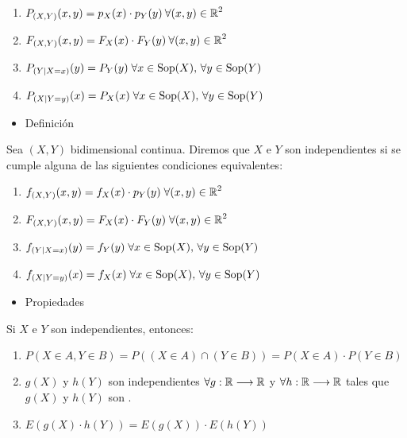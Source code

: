 \begin{enumerate}[label=\color{red}\textbf{\Alph*)},leftmargin=*]
\begin{enumerate}[label=\color{lightblue}\arabic*)]
	\item $P_{(X,Y)}(x,y)=p_X(x)\cdot p_Y(y)\:\forall(x,y)\in\operatorname{\mathbb{R}}^2$
	\item $F_{(X,Y)}(x,y)=F_X(x)\cdot F_Y(y)\:\forall(x,y)\in\operatorname{\mathbb{R}}^2$
	\item $P_{(Y|X=x)}(y)=P_Y(y)\;\forall x\in\operatorname{Sop}(X),\,\forall y\in\operatorname{Sop}(Y)$
	\item $P_{(X|Y=y)}(x)=P_X(x)\;\forall x\in\operatorname{Sop}(X),\,\forall y\in\operatorname{Sop}(Y)$
\end{enumerate}
\begin{itemize}[label=\color{red}\textbullet, leftmargin=*]
	\item \color{lightblue}Definición
\end{itemize}
Sea $(X,Y)$ \va bidimensional continua. Diremos que $X$ e $Y$ son independientes si se cumple alguna de las siguientes condiciones equivalentes:
\begin{enumerate}[label=\color{lightblue}\arabic*)]
	\item $f_{(X,Y)}(x,y)=f_X(x)\cdot p_Y(y)\;\forall(x,y)\in\operatorname{\mathbb{R}}^2$
	\item $F_{(X,Y)}(x,y)=F_X(x)\cdot F_Y(y)\;\forall(x,y)\in\operatorname{\mathbb{R}}^2$
	\item $f_{(Y|X=x)}(y)=f_Y(y)\;\forall x\in\operatorname{Sop}(X),\,\forall y\in\operatorname{Sop}(Y)$
	\item $f_{(X|Y=y)}(x)=f_X(x)\;\forall x\in\operatorname{Sop}(X),\,\forall y\in\operatorname{Sop}(Y)$
\end{enumerate}
\begin{itemize}[label=\color{red}\textbullet, leftmargin=*]
	\item \color{lightblue}Propiedades
\end{itemize}
Si $X$ e $Y$ son \vas independientes, entonces:
\begin{enumerate}[label=\color{lightblue}\arabic*)]
	\item $P(X\in A,Y\in B)=P\left((X\in A)\cap(Y\in B)\right)=P(X\in A)\cdot P(Y\in B)$
	\item $g(X)$ y $h(Y)$ son independientes $\forall g:\operatorname{\mathbb{R}}\longrightarrow\operatorname{\mathbb{R}}$ y $\forall h:\operatorname{\mathbb{R}}\longrightarrow\operatorname{\mathbb{R}}$ tales que $g(X)$ y $h(Y)$ son \vas.
	\item $E\left(g(X)\cdot h(Y)\right)=E(g(X))\cdot E(h(Y))$
\end{enumerate}

\end{enumerate}
